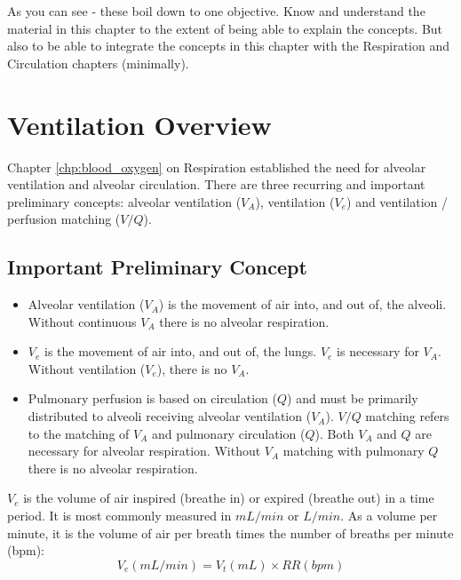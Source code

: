 As you can see - these boil down to one objective. Know and understand the material in this chapter to the extent of being able to explain the concepts. But also to be able to integrate the concepts in this chapter with the Respiration and Circulation chapters (minimally).

\section{Ventilation Overview}

Chapter \ref{chp:blood_oxygen} on Respiration established the need for alveolar ventilation and alveolar circulation. There are three recurring and important preliminary concepts: alveolar ventilation ($V_A$), ventilation ($V_e$) and ventilation / perfusion matching ($V/Q$).

\subsection{Important Preliminary Concept}

\begin{itemize}
    \item Alveolar ventilation ($V_A$) is the movement of air into, and out of, the alveoli. Without continuous $V_A$ there is no alveolar respiration. 
    \item $V_e$ is the movement of air into, and out of, the lungs. $V_e$ is necessary for $V_A$. Without ventilation ($V_e$), there is no $V_A$. \item Pulmonary perfusion is based on circulation ($Q$) and must be primarily distributed to alveoli receiving alveolar ventilation ($V_A$). $V/Q$ matching refers to the matching of $V_A$ and pulmonary circulation ($Q$). Both $V_A$ and $Q$ are necessary for alveolar respiration. Without $V_A$ matching with pulmonary $Q$ there is no alveolar respiration.
 \end{itemize}

$V_e$ is the volume of air inspired (breathe in) or expired (breathe out) in a time period. It is most commonly measured in $mL/min$ or $L/min$. As a volume per minute, it is the volume of air per breath times the number of breaths per minute (bpm):
\vspace{3mm}
\begin{equation}
    V_e (mL/min) = V_t (mL) \times RR (bpm)
    \label{Ve}
\end{equation}
\vspace{3mm}

